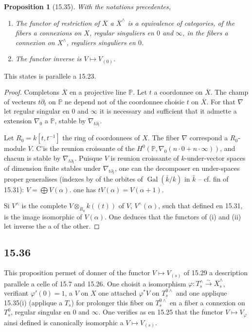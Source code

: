 \documentclass[12pt,a4paper]{article}
\theoremstyle{plain}
\newtheorem{proposition}[theorem]{Proposition}
\theoremstyle{definition}
\theoremstyle{remark}
\DeclareMathOperator{\Gal}{Gal}
\newcommand{\bP}{\mathbb{P}}
\begin{document}
\begin{proposition}[15.35]
With the notations precedentes,
\begin{enumerate}[label=(\roman*), nosep]
\item The functor of restriction of $\overline{X}$ a $\overline{X}^\wedge$ is a equivalence of categories, of the fibers a connexions on $X$, regular singuliers en $0$ and $\infty$, in the fibers a connexion on $X^\wedge$, reguliers singuliers en $0$.
\item The functor inverse is $V \mapsto V_{(0)}$.
\end{enumerate}
\end{proposition}

This states is parallele a 15.23.

\begin{proof}
Completons $\overline{X}$ en a projective line $\bP$. Let $t$ a coordonnee on $\overline{X}$. The champ of vecteurs $t\partial_t$ on $\bP$ ne depend not of the coordonnee choisie $t$ on $\overline{X}$. For that $\nabla$ let regular singular en $0$ and $\infty$ it is necessary and sufficient that it admette a extension $\nabla_0$ a $\bP$, stable by $\nabla_{t\partial_t}$.

Let $R_0 = k[t, t^{-1}]$ the ring of coordonnees of $X$. The fiber $\nabla$ correspond a $R_0$-module $V$. C'is the reunion croissante of the $H^0(\bP, \nabla_0(n \cdot 0 + n \cdot \infty))$, and chacun is stable by $\nabla_{t\partial_t}$. Puisque $V$ is reunion croissante of $k$-under-vector spaces of dimension finite stables under $\nabla_{t\partial_t}$, one can the decomposer en under-spaces proper generalises (indexes by of the orbites of $\Gal(\bar{k}/k)$ in $\bar{k}$ -- cf. fin of 15.31): $V = \bigoplus V(\alpha)$. one has $tV(\alpha) = V(\alpha + 1)$.

Si $V^\wedge$ is the complete $V \otimes_{R_0} k((t))$ of $V$, $V^\wedge(\alpha)$, such that defined en 15.31, is the image isomorphic of $V(\alpha)$. One deduces that the functors of (i) and (ii) let inverse the a of the other.
\end{proof}

\subsection*{15.36}

This proposition permet of donner of the functor $V \mapsto V_{(s)}$ of 15.29 a description parallele a celle of 15.7 and 15.26. One choisit a isomorphism $\varphi: T_s^\wedge \xrightarrow{\sim} \overline{X}_s^\wedge$, verifiant $\varphi'(0) = 1$, a $V$ on $X$ one attached $\varphi^* V$ on $T_s^{0\wedge}$ and one applique 15.35(i) (applique a $T_s$) for prolonger this fiber on $T_s^{0\wedge}$ en a fiber a connexion on $T_s^0$, regular singular en $0$ and $\infty$. One verifies as en 15.25 that the functor $V \mapsto V_\varphi$ ainsi defined is canonically isomorphic a $V \mapsto V_{(s)}$.
\end{document}
